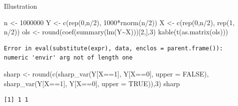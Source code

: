\documentclass[
  11pt,
  ignorenonframetext,
]{beamer}
\newenvironment{Shaded}{\begin{snugshade}}{\end{snugshade}}
\newcommand{\AttributeTok}[1]{\textcolor[rgb]{0.40,0.45,0.13}{#1}}
\newcommand{\ConstantTok}[1]{\textcolor[rgb]{0.56,0.35,0.01}{#1}}
\newcommand{\DecValTok}[1]{\textcolor[rgb]{0.68,0.00,0.00}{#1}}
\newcommand{\FunctionTok}[1]{\textcolor[rgb]{0.28,0.35,0.67}{#1}}
\newcommand{\NormalTok}[1]{\textcolor[rgb]{0.00,0.23,0.31}{#1}}
\newcommand{\OtherTok}[1]{\textcolor[rgb]{0.00,0.23,0.31}{#1}}
\newcommand{\SpecialCharTok}[1]{\textcolor[rgb]{0.37,0.37,0.37}{#1}}
\begin{document}
\begin{frame}[fragile]{Illustration}
\protect\hypertarget{illustration-1}{}
\begin{Shaded}
\begin{Highlighting}[]
\NormalTok{n   }\OtherTok{\textless{}{-}} \DecValTok{1000000}
\NormalTok{Y   }\OtherTok{\textless{}{-}} \FunctionTok{c}\NormalTok{(}\FunctionTok{rep}\NormalTok{(}\DecValTok{0}\NormalTok{,n}\SpecialCharTok{/}\DecValTok{2}\NormalTok{), }\DecValTok{1000}\SpecialCharTok{*}\FunctionTok{rnorm}\NormalTok{(n}\SpecialCharTok{/}\DecValTok{2}\NormalTok{))}
\NormalTok{X   }\OtherTok{\textless{}{-}} \FunctionTok{c}\NormalTok{(}\FunctionTok{rep}\NormalTok{(}\DecValTok{0}\NormalTok{,n}\SpecialCharTok{/}\DecValTok{2}\NormalTok{), }\FunctionTok{rep}\NormalTok{(}\DecValTok{1}\NormalTok{, n}\SpecialCharTok{/}\DecValTok{2}\NormalTok{))}
\NormalTok{ols }\OtherTok{\textless{}{-}} \FunctionTok{round}\NormalTok{(}\FunctionTok{coef}\NormalTok{(}\FunctionTok{summary}\NormalTok{(}\FunctionTok{lm}\NormalTok{(Y}\SpecialCharTok{\textasciitilde{}}\NormalTok{X)))[}\DecValTok{2}\NormalTok{,],}\DecValTok{3}\NormalTok{)}
\FunctionTok{kable}\NormalTok{(}\FunctionTok{t}\NormalTok{(}\FunctionTok{as.matrix}\NormalTok{(ols)))}
\end{Highlighting}
\end{Shaded}

\begin{verbatim}
Error in eval(substitute(expr), data, enclos = parent.frame()): numeric 'envir' arg not of length one
\end{verbatim}

\begin{Shaded}
\begin{Highlighting}[]
\NormalTok{sharp }\OtherTok{\textless{}{-}} \FunctionTok{round}\NormalTok{(}\FunctionTok{c}\NormalTok{(}\FunctionTok{sharp\_var}\NormalTok{(Y[X}\SpecialCharTok{==}\DecValTok{1}\NormalTok{], Y[X}\SpecialCharTok{==}\DecValTok{0}\NormalTok{], }\AttributeTok{upper =} \ConstantTok{FALSE}\NormalTok{), }
                 \FunctionTok{sharp\_var}\NormalTok{(Y[X}\SpecialCharTok{==}\DecValTok{1}\NormalTok{], Y[X}\SpecialCharTok{==}\DecValTok{0}\NormalTok{], }\AttributeTok{upper =} \ConstantTok{TRUE}\NormalTok{)),}\DecValTok{3}\NormalTok{)}
\NormalTok{sharp}
\end{Highlighting}
\end{Shaded}

\begin{verbatim}
[1] 1 1
\end{verbatim}
\end{frame}
\end{document}
